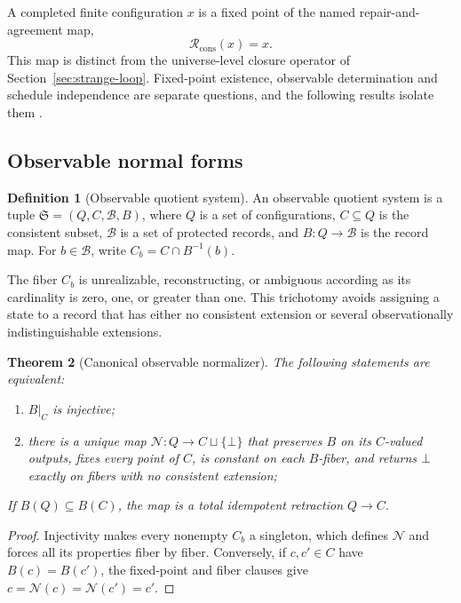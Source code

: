 \documentclass[11pt]{article}
\newtheorem{theorem}{Theorem}[section]
\theoremstyle{definition}
\newtheorem{definition}[theorem]{Definition}
\theoremstyle{remark}
\begin{document}
A completed finite configuration $x$ is a fixed point of the named
repair-and-agreement map,
\[
\mathcal R_{\mathrm{cons}}(x)=x .
\]
This map is
distinct from the universe-level closure operator of
Section~\ref{sec:strange-loop}. Fixed-point existence, observable
determination and schedule independence are separate questions, and the
following results isolate them \cite{ophnormalforms,ophconsensus}.

\subsection{Observable normal forms}

\begin{definition}[Observable quotient system]
An observable quotient system is a tuple $\mathfrak S=(Q,C,\mathcal B,B)$,
where $Q$ is a set of configurations, $C\subseteq Q$ is the consistent
subset, $\mathcal B$ is a set of protected records, and $B:Q\to\mathcal B$
is the record map. For $b\in\mathcal B$, write $C_b=C\cap B^{-1}(b)$.
\end{definition}

The fiber $C_b$ is unrealizable, reconstructing, or ambiguous according as
its cardinality is zero, one, or greater than one. This trichotomy avoids
assigning a state to a record that has either no consistent extension or
several observationally indistinguishable extensions.

\begin{theorem}[Canonical observable normalizer]
\label{thm:observable-normalizer}
The following statements are equivalent:
\begin{enumerate}[label=(\roman*),leftmargin=1.6em]
\item $B|_C$ is injective;
\item there is a unique map $\mathcal N:Q\to C\sqcup\{\bot\}$ that preserves $B$ on
its $C$-valued outputs, fixes every point of $C$, is constant on each
$B$-fiber, and returns $\bot$ exactly on fibers with no consistent extension;
\end{enumerate}
If $B(Q)\subseteq B(C)$, the map is a total idempotent retraction $Q\to C$.
\end{theorem}

\begin{proof}
Injectivity makes every nonempty $C_b$ a singleton, which defines $\mathcal N$ and forces all its properties fiber by fiber. Conversely, if $c,c'\in C$ have $B(c)=B(c')$, the fixed-point and fiber clauses give $c=\mathcal N(c)=\mathcal N(c')=c'$.
\end{proof}
\end{document}

